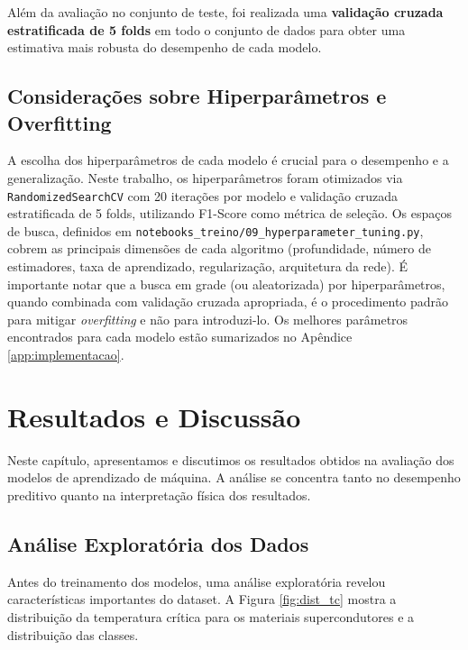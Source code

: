 \documentclass[12pt, a4paper, oneside]{report}
\begin{document}
Além da avaliação no conjunto de teste, foi realizada uma \textbf{validação cruzada estratificada de 5 folds} em todo o conjunto de dados para obter uma estimativa mais robusta do desempenho de cada modelo.

\section{Considerações sobre Hiperparâmetros e Overfitting}

A escolha dos hiperparâmetros de cada modelo é crucial para o desempenho e a generalização. Neste trabalho, os hiperparâmetros foram otimizados via \texttt{RandomizedSearchCV} com 20 iterações por modelo e validação cruzada estratificada de 5 folds, utilizando F1-Score como métrica de seleção. Os espaços de busca, definidos em \texttt{notebooks\_treino/09\_hyperparameter\_tuning.py}, cobrem as principais dimensões de cada algoritmo (profundidade, número de estimadores, taxa de aprendizado, regularização, arquitetura da rede). É importante notar que a busca em grade (ou aleatorizada) por hiperparâmetros, quando combinada com validação cruzada apropriada, é o procedimento padrão para mitigar \textit{overfitting} e não para introduzi-lo. Os melhores parâmetros encontrados para cada modelo estão sumarizados no Apêndice \ref{app:implementacao}.

\chapter{Resultados e Discussão}
\label{chap:resultados}

Neste capítulo, apresentamos e discutimos os resultados obtidos na avaliação dos modelos de aprendizado de máquina. A análise se concentra tanto no desempenho preditivo quanto na interpretação física dos resultados.

\section{Análise Exploratória dos Dados}

Antes do treinamento dos modelos, uma análise exploratória revelou características importantes do dataset. A Figura \ref{fig:dist_tc} mostra a distribuição da temperatura crítica para os materiais supercondutores e a distribuição das classes.
\end{document}
